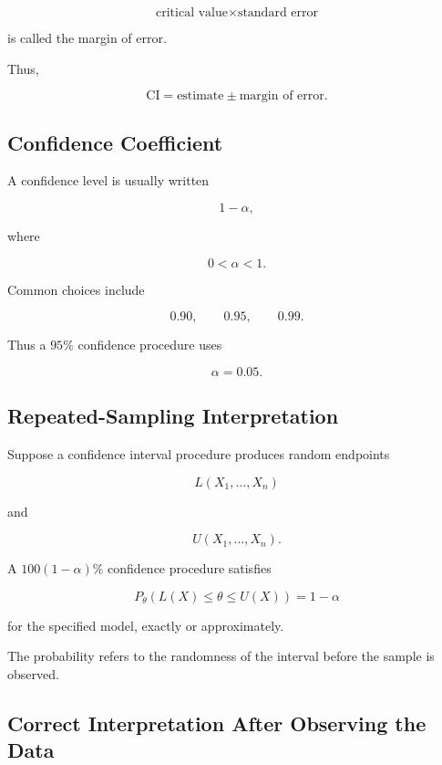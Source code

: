 \[
\boxed{
\text{critical value}
\times
\text{standard error}
}
\]

is called the margin of error.

Thus,

\[
\boxed{
\text{CI}
=
\text{estimate}
\pm
\text{margin of error}.
}
\]

\subsection{Confidence Coefficient}
\label{subsec:confidence-coefficient}

A confidence level is usually written

\[
\boxed{
1-\alpha,
}
\]

where

\[
0<\alpha<1.
\]

Common choices include

\[
0.90,
\qquad
0.95,
\qquad
0.99.
\]

Thus a \(95\%\) confidence procedure uses

\[
\alpha=0.05.
\]

\subsection{Repeated-Sampling Interpretation}
\label{subsec:repeated-sampling-confidence}

Suppose a confidence interval procedure produces random endpoints

\[
L(X_1,\ldots,X_n)
\]

and

\[
U(X_1,\ldots,X_n).
\]

A \(100(1-\alpha)\%\) confidence procedure satisfies

\[
\boxed{
P_\theta
\left(
L(X)\leq\theta\leq U(X)
\right)
=
1-\alpha
}
\]

for the specified model, exactly or approximately.

The probability refers to the randomness of the interval before the
sample is observed.

\subsection{Correct Interpretation After Observing the Data}
\label{subsec:correct-confidence-interpretation}

